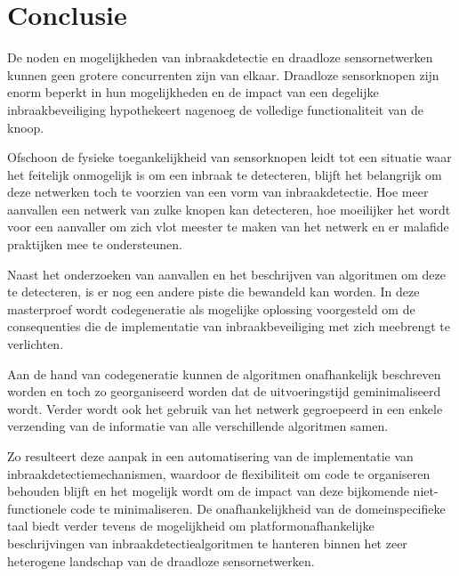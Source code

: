 \documentclass[12pt,a4paper]{article}
\begin{document}
\section*{Conclusie}

De noden en mogelijkheden van inbraakdetectie en draadloze sensornetwerken
kunnen geen grotere concurrenten zijn van elkaar. Draadloze sensorknopen zijn
enorm beperkt in hun mogelijkheden en de impact van een degelijke
inbraakbeveiliging hypothekeert nagenoeg de volledige functionaliteit van de
knoop.

Ofschoon de fysieke toegankelijkheid van sensorknopen leidt tot een situatie
waar het feitelijk onmogelijk is om een inbraak te detecteren, blijft het
belangrijk om deze netwerken toch te voorzien van een vorm van inbraakdetectie.
Hoe meer aanvallen een netwerk van zulke knopen kan detecteren, hoe moeilijker
het wordt voor een aanvaller om zich vlot meester te maken van het netwerk en
er malafide praktijken mee te ondersteunen.

Naast het onderzoeken van aanvallen en het beschrijven van algoritmen om deze
te detecteren, is er nog een andere piste die bewandeld kan worden. In deze
masterproef wordt codegeneratie als mogelijke oplossing voorgesteld om de
consequenties die de implementatie van inbraakbeveiliging met zich meebrengt te
verlichten.

Aan de hand van codegeneratie kunnen de algoritmen onafhankelijk beschreven
worden en toch zo georganiseerd worden dat de uitvoeringstijd geminimaliseerd
wordt. Verder wordt ook het gebruik van het netwerk gegroepeerd in een enkele
verzending van de informatie van alle verschillende algoritmen samen.

Zo resulteert deze aanpak in een automatisering van de implementatie van
inbraakdetectiemechanismen, waardoor de flexibiliteit om code te organiseren
behouden blijft en het mogelijk wordt om de impact van deze bijkomende
niet-functionele code te minimaliseren. De onafhankelijkheid van de
domeinspecifieke taal biedt verder tevens de mogelijkheid om
platformonafhankelijke beschrijvingen van inbraakdetectiealgoritmen te
hanteren binnen het zeer heterogene landschap van de draadloze sensornetwerken.
\end{document}
